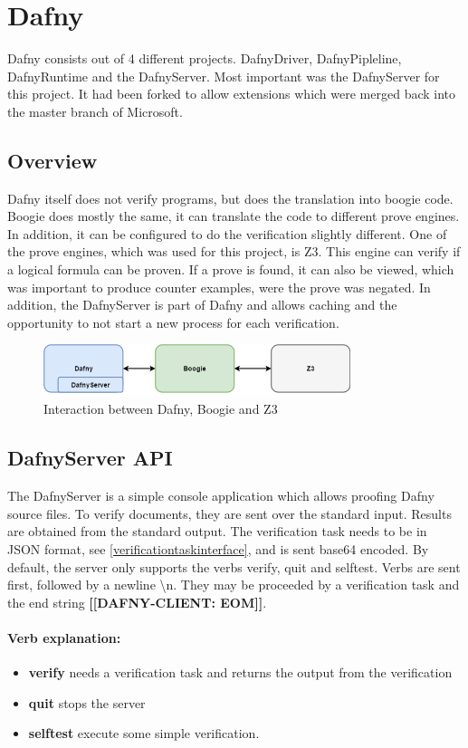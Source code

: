 \section{Dafny}
Dafny consists out of 4 different projects. DafnyDriver, DafnyPipleline, DafnyRuntime and the DafnyServer. Most important was the DafnyServer for this project. It had been forked to allow extensions which were merged back into the master branch of Microsoft. 
\subsection{Overview}
Dafny itself does not verify programs, but does the translation into boogie code. Boogie does mostly the same, it can translate the code to different prove engines. In addition, it can be configured to do the verification slightly different. One of the prove engines, which was used for this project, is Z3. This engine can verify if a logical formula can be proven. If a prove is found, it can also be viewed, which was important to produce counter examples, were the prove was negated. 
In addition, the DafnyServer is part of Dafny and allows caching and the opportunity to not start a new process for each verification.\newline 
\begin{figure}[H]
	\centering
	\includegraphics[width=0.8\textwidth]{img/dafny_overview}
	\caption{Interaction between Dafny, Boogie and Z3}
	\label{fig:dafny_overview}
\end{figure}
\subsection{DafnyServer API}
The DafnyServer is a simple console application which allows proofing Dafny source files. To verify documents, they are sent over the standard input. Results are obtained from the standard output. The verification task needs to be in JSON format, see \ref{verificationtaskinterface}, and is sent base64 encoded. By default, the server only supports the verbs verify, quit and selftest. Verbs are sent first, followed by a newline \textbackslash{n}. They may be proceeded by a verification task and the end string \textbf{[[DAFNY-CLIENT: EOM]]}. 
\paragraph{Verb explanation:}
\begin{itemize}
	\item \textbf{verify} needs a verification task and returns the output from the verification
	\item \textbf{quit} stops the server
	\item \textbf{selftest} execute some simple verification.
\end{itemize}
